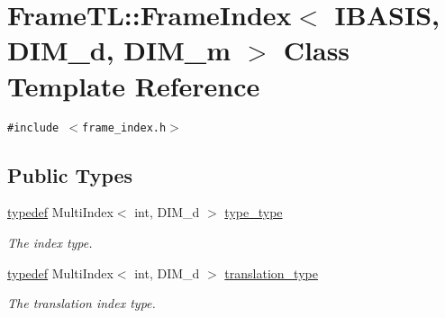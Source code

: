 \hypertarget{classFrameTL_1_1FrameIndex}{
\section{FrameTL::FrameIndex$<$ IBASIS, DIM\_\-d, DIM\_\-m $>$ Class Template Reference}
\label{classFrameTL_1_1FrameIndex}
}
{\tt \#include $<$frame\_\-index.h$>$}

\subsection*{Public Types}
\begin{CompactItemize}
\item 
\hypertarget{classFrameTL_1_1FrameIndex_e92c4f89e747a61eb2f7275d0bd01e25}{
\hyperlink{structtypedef}{typedef} MultiIndex$<$ int, DIM\_\-d $>$ \hyperlink{classFrameTL_1_1FrameIndex_e92c4f89e747a61eb2f7275d0bd01e25}{type\_\-type}}
\label{classFrameTL_1_1FrameIndex_e92c4f89e747a61eb2f7275d0bd01e25}

\begin{CompactList}\small\item\em The index type. \item\end{CompactList}\item 
\hypertarget{classFrameTL_1_1FrameIndex_222e44072cf0330c11cd157d4a1ff6a1}{
\hyperlink{structtypedef}{typedef} MultiIndex$<$ int, DIM\_\-d $>$ \hyperlink{classFrameTL_1_1FrameIndex_222e44072cf0330c11cd157d4a1ff6a1}{translation\_\-type}}
\label{classFrameTL_1_1FrameIndex_222e44072cf0330c11cd157d4a1ff6a1}

\begin{CompactList}\small\item\em The translation index type. \item\end{CompactList}\end{CompactItemize}
